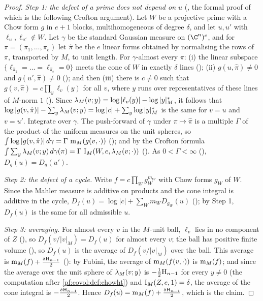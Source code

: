 \begin{proof}
\emph{Step 1: the defect of a prime does not depend on $u$}
(, the formal proof of which is the following
Crofton argument). Let $W$ be a projective prime with a Chow form $g$ in $e+1$ blocks, multihomogeneous of
degree $\delta$, and let $u,u'$ with $\ell_u,\ell_{u'}\notin W$. Let $\gamma$ be the standard Gaussian
measure on $(\C^n)^e$, and for $\pi=(\pi_1,\dots,\pi_e)$ let $\hat\pi$ be the $e$ linear forms obtained by
normalising the rows of $\pi$, transported by $M$, to unit length. For $\gamma$-almost every $\pi$:
(i) the linear subspace $\{\ell_{\hat\pi_1}=\dots=\ell_{\hat\pi_e}=0\}$ meets the cone of $W$ in exactly
$\delta$ lines (); (ii) $g(u,\hat\pi)\ne0$ and
$g(u',\hat\pi)\ne0$ (); and then (iii) there is
$c\ne0$ such that $g(v,\hat\pi)=c\prod_y\ell_v(y)$ for all $v$, where $y$ runs over representatives of these
lines of $M$-norm $1$ (). Since
$\lambda_M(v;y)=\log|\ell_v(y)|-\log|y|^*_M$, it follows that
$\log|g(v,\hat\pi)|-\sum_y\lambda_M(v;y)=\log|c|+\sum_y\log|y|^*_M$ is the same for $v=u$ and $v=u'$.
Integrate over $\gamma$. The push-forward of $\gamma$ under $\pi\mapsto\hat\pi$ is a multiple $\Gamma$ of the
product of the uniform measures on the unit spheres, so
$\int\log|g(v,\hat\pi)|\,d\gamma=\Gamma\,\operatorname{m}_M(g(v,\cdot))$
(); and by the Crofton formula
$\int\sum_y\lambda_M(v;y)\,d\gamma(\pi)=\Gamma\,\operatorname{I}_M(W,e,\lambda_M(v;\cdot))$
(). As $0<\Gamma<\infty$
(), $D_g(u)=D_g(u')$.

\emph{Step 2: the defect of a cycle.} Write $f=c\prod_Wg_W^{m_W}$ with Chow forms $g_W$ of $W$. Since the
Mahler measure is additive on products and the cone integral is additive in the cycle,
$D_f(u)=\log|c|+\sum_Wm_WD_{g_W}(u)$ ();
by Step 1, $D_f(u)$ is the same for all admissible $u$.

\emph{Step 3: averaging.} For almost every $v$ in the $M$-unit ball, $\ell_v$ lies in no component of $Z$
(), so $D_f(v/|v|_M)=D_f(u)$ for almost
every $v$; the ball has positive finite volume
(), so $D_f(u)$ is the average of $D_f(v/|v|_M)$
over the ball. This average is $\operatorname{m}_M(f)+\frac{\delta\mathrm{H}_{n-1}}2$
(): by Fubini, the average of
$\operatorname{m}_M(f(v,\cdot))$ is $\operatorname{m}_M(f)$; and since the average over the unit sphere of
$\lambda_M(v;y)$ is $-\frac12\mathrm{H}_{n-1}$ for every $y\ne0$ (the computation after
\cref{pf:covol:def:chowht}) and $\operatorname{I}_M(Z,e,1)=\delta$, the average of the cone integral is
$-\frac{\delta\mathrm{H}_{n-1}}2$. Hence $D_f(u)=\operatorname{m}_M(f)+\frac{\delta\mathrm{H}_{n-1}}2$, which is the
claim.
\end{proof}

